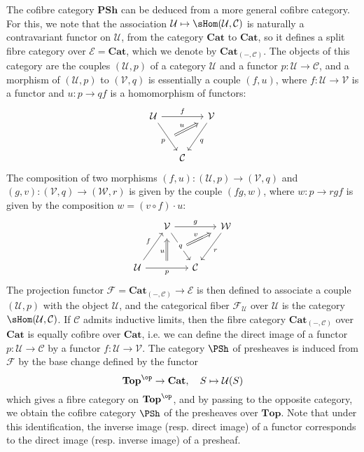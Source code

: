 \begin{example}
The cofibre category $\mathbf{PSh}$ can be deduced from a more general cofibre category. For this, we note that the association $\mathcal{U}\mapsto\sHom(\mathcal{U},\mathcal{C})$ is naturally a contravariant functor on $\mathcal{U}$, from the category $\mathbf{Cat}$ to $\mathbf{Cat}$, so it defines a split fibre category over $\mathcal{E}=\mathbf{Cat}$, which we denote by $\mathbf{Cat}_{(-,\mathcal{C})}$. The objects of this category are the couples $(\mathcal{U},p)$ of a category $\mathcal{U}$ and a functor $p:\mathcal{U}\to \mathcal{C}$, and a morphism of $(\mathcal{U},p)$ to $(\mathcal{V},q)$ is essentially a couple $(f,u)$, where $f:\mathcal{U}\to \mathcal{V}$ is a functor and $u:p\to qf$ is a homomorphism of functors:
\[\begin{tikzcd}[column sep=5mm,row sep=10mm]
\mathcal{U}\ar[rd,swap,"p",""{name=U, below}]\ar[rr,"f"]&&\mathcal{V}\ar[ld,"q"]\\
&\mathcal{C}&
\arrow[Rightarrow,from=U,to=1-3,"u",shorten <=2mm,shorten >=2mm]
\end{tikzcd}\]
The composition of two morphisms $(f,u):(\mathcal{U},p)\to (\mathcal{V},q)$ and $(g,v):(\mathcal{V},q)\to (\mathcal{W},r)$ is given by the couple $(fg,w)$, where $w:p\to rgf$ is given by the composition $w=(v\circ f)\cdot u$:
\[\begin{tikzcd}[column sep=5mm,row sep=10mm]
&\mathcal{V}\ar[rr,"g"]\ar[rd,"q"description,""{name=V}]&&\mathcal{W}\ar[ld,"r"]\\
\mathcal{U}\ar[ru,"f"]\ar[rr,swap,"p",""{name=U,above}]&&\mathcal{C}
\arrow[Rightarrow,from=U,to=1-2,"u",shorten <=1mm,shorten >=2mm,pos=0.4]
\arrow[Rightarrow,from=V,to=1-4,"v",
start anchor={[xshift=-1pt,yshift=-3pt]},
shorten <=1mm,shorten >=2mm]
\end{tikzcd}\]
The projection functor $\mathscr{F}=\mathbf{Cat}_{(-,\mathcal{C})}\to \mathcal{E}$ is then defined to associate a couple $(\mathcal{U},p)$ with the object $\mathcal{U}$, and the categorical fiber $\mathcal{F}_\mathcal{U}$ over $\mathcal{U}$ is the category $\sHom(\mathcal{U},\mathcal{C})$. If $\mathcal{C}$ admits inductive limits, then the fibre category $\mathbf{Cat}_{(-,\mathcal{C})}$ over $\mathbf{Cat}$ is equally cofibre over $\mathbf{Cat}$, i.e. we can define the direct image of a functor $p:\mathcal{U}\to \mathcal{C}$ by a functor $f:\mathcal{U}\to \mathcal{V}$. The category $\PSh$ of presheaves is induced from $\mathcal{F}$ by the base change defined by the functor
\[\mathbf{Top}^{\op}\to \mathbf{Cat},\quad S\mapsto\mathcal{U}(S)\]
which gives a fibre category on $\mathbf{Top}^{\op}$, and by passing to the opposite category, we obtain the cofibre category $\PSh$ of the presheaves over $\mathbf{Top}$. Note that under this identification, the inverse image (resp. direct image) of a functor corresponds to the direct image (resp. inverse image) of a presheaf.
\end{example}
